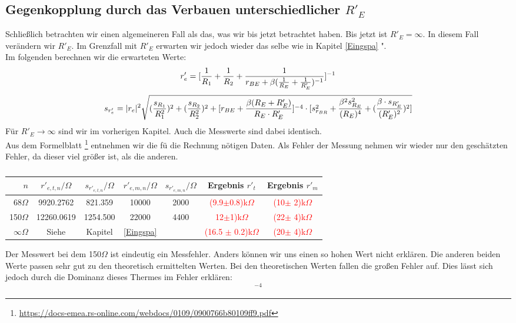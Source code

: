 \subsection{Gegenkopplung durch das Verbauen unterschiedlicher $R'_E$}

Schließlich betrachten wir einen algemeineren Fall als das, was wir bis jetzt betrachtet haben. 
Bis jetzt ist $R'_E = \infty$. In diesem Fall verändern wir $R'_E$. Im Grenzfall mit $R'_E$ erwarten wir 
jedoch wieder das selbe wie in Kapitel \glqq \ref{Eingspa}  ".\\
Im folgenden berechnen wir die erwarteten Werte:\\
\begin{equation*}
    \centering
    r'_e = [\frac{1}{R_1}+\frac{1}{R_2}+\frac{1}{r_{BE}+\beta(\frac{1}{R_E}+\frac{1}{R'_{E}})^{-1}}]^{-1}
\end{equation*}
\begin{equation*}
    \centering
    s_{r'_e} = |r_e|^2 \sqrt{(\frac{s_{R_1}}{R_1^2})^2+(\frac{s_{R_2}}{R_2^2})^2+[r_{BE}+\frac{\beta(R_E+R'_E)}{R_E \cdot R'_E}]^{-4} \cdot [s_{r_{BR}}^2+\frac{\beta^2 s_{R_E}^2}{(R_{E})^4}+(\frac{\beta \cdot s_{R'_E}}{(R'_{E})^2})^2]}
\end{equation*}
Für $R'_E \to \infty$ sind wir im vorherigen Kapitel. Auch die Messwerte sind dabei identisch.\\
Aus dem Formelblatt \footnote{\url{https://docs-emea.rs-online.com/webdocs/0109/0900766b80109ff9.pdf}} entnehmen wir die fü die Rechnung nötigen Daten.
Als Fehler der Messung nehmen wir wieder nur den geschätzten Fehler, da dieser viel größer ist, als die anderen.
\begin{table}[h]
    \centering
    \begin{tabular}{r|c|c|c|c||c||c}
         $n$& $r'_{e,t,n}/\Omega $ & $s_{r'_{e,t,n}}/\Omega $ & $r'_{e,m,n}/\Omega$ & $s_{r'_{e,m,n}}/\Omega $& Ergebnis $r'_t$ & Ergebnis $r'_m$\\
        \hline
        68$\Omega$ & 9920.2762 & 821.359 & 10000 & 2000& \textcolor{red}{(9.9$\pm$0.8)k$\Omega$}& \textcolor{red}{(10$\pm $ 2)k$\Omega$}  \\
        150$\Omega$ &12260.0619 & 1254.500  &22000 & 4400& \textcolor{red}{12$\pm$1)k$\Omega$}& \textcolor{red}{(22$\pm $ 4)k$\Omega$}  \\
        $\infty\Omega$& Siehe & Kapitel& \ref{Eingspa} &  & \textcolor{red}{(16.5 $\pm$ 0.2)k$\Omega$}& \textcolor{red}{(20$\pm $ 4)k$\Omega$}  \\
    \end{tabular}
    \caption{}
\end{table}
Der Messwert bei dem 150$\Omega$ ist eindeutig ein Messfehler. Anders können wir uns einen so hohen Wert nicht erklären. Die anderen beiden Werte passen sehr gut 
zu den theoretisch ermittelten Werten. Bei den theoretischen Werten fallen die großen Fehler auf. Dies lässt sich jedoch durch die Dominanz dieses Thermes im Fehler erklären:
\begin{equation*}
    [r_{BE}+\frac{\beta(R_E+R'_E)}{R_E \cdot R'_E}]^{-4}
\end{equation*}

